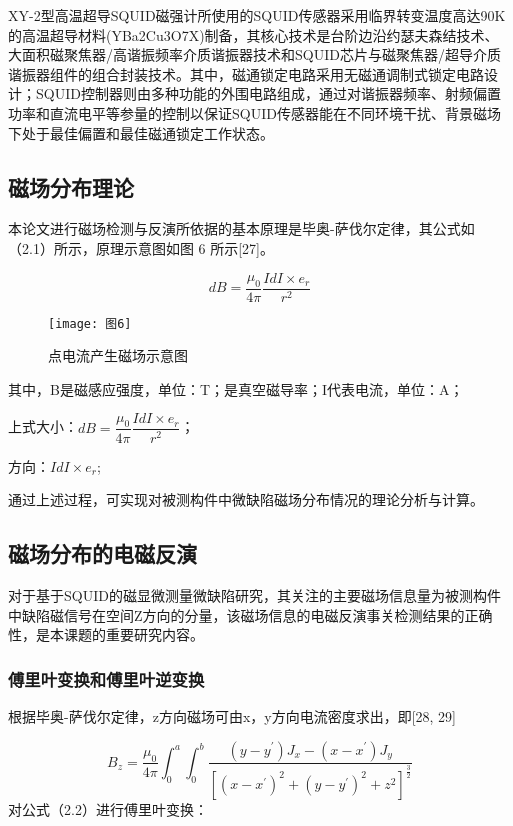 \documentclass[a4paper,12pt，twoside]{ctexart}
\begin{document}
	XY-2型高温超导SQUID磁强计所使用的SQUID传感器采用临界转变温度高达90K的高温超导材料(YBa2Cu3O7X)制备，其核心技术是台阶边沿约瑟夫森结技术、大面积磁聚焦器/高谐振频率介质谐振器技术和SQUID芯片与磁聚焦器/超导介质谐振器组件的组合封装技术。其中，磁通锁定电路采用无磁通调制式锁定电路设计；SQUID控制器则由多种功能的外围电路组成，通过对谐振器频率、射频偏置功率和直流电平等参量的控制以保证SQUID传感器能在不同环境干扰、背景磁场下处于最佳偏置和最佳磁通锁定工作状态。\par
	\subsection{磁场分布理论}
	本论文进行磁场检测与反演所依据的基本原理是毕奥-萨伐尔定律，其公式如（2.1）所示，原理示意图如图 6 所示[27]。\par
	\begin{equation}
		dB = \dfrac{\mu_{0}}{4 \pi} \dfrac{IdI\times e_{r}}{r^{2}}
	\end{equation}
	
	\begin{figure}[htbp]
		\centering
		\texttt{[image: 图6]}
		\caption{点电流产生磁场示意图}\label{图6}
	\end{figure}
	其中，B是磁感应强度，单位：T；是真空磁导率；I代表电流，单位：A；\par
	上式大小：$dB = \dfrac{\mu_{0}}{4 \pi} \dfrac{IdI\times e_{r}}{r^{2}}$；\par
	方向：$IdI\times e_{r}$;\par
	通过上述过程，可实现对被测构件中微缺陷磁场分布情况的理论分析与计算。

	
	\subsection{磁场分布的电磁反演}
	对于基于SQUID的磁显微测量微缺陷研究，其关注的主要磁场信息量为被测构件中缺陷磁信号在空间Z方向的分量，该磁场信息的电磁反演事关检测结果的正确性，是本课题的重要研究内容。
	
	
	
	\subsubsection{傅里叶变换和傅里叶逆变换}
	根据毕奥-萨伐尔定律，z方向磁场可由x，y方向电流密度求出，即[28, 29]
	
	\begin{equation}
		B_{z} = \dfrac{\mu_{0}}{4 \pi} \int_{0}^{a}\int_{0}^{b}
		\dfrac{(y-y^{'}) J_{x}-(x-x^{'}) J_{y}}{[(x-x^{'})^{2}+(y-y^{'})^{2}+z^{2}]^{\frac{3}{2}}}
	\end{equation}
	对公式（2.2）进行傅里叶变换：\par
	
\end{document}
